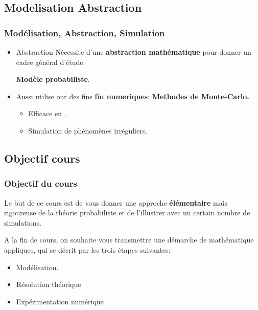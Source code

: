 \documentclass{beamer}
\begin{document}
\subsection{Modelisation Abstraction}
\begin{frame}[<+->]
    \frametitle{Modélisation, Abstraction, Simulation}
    
    \begin{itemize}
        \item {}

            \begin{block}{Abstraction}
                \small
                Nécessite d'une \alert{\textbf{abstraction mathématique}}  pour
                donner un cadre général d'étude.
            \end{block}
            \begin{center}
                \textbf{Modèle probabiliste}.
            \end{center}
        \item Aussi utilise our des fins \textbf{fin numeriques}:
            \alert{\textbf{Methodes de
        Monte-Carlo.}}
        \vspace{1cm}
         \begin{itemize}
             \item Efficace en \textbf{}.\\[.5cm]
             \item Simulation de \alert{{phénomènes irréguliers.}}
         \end{itemize}
    \end{itemize}
\end{frame}
\subsection{Objectif cours}
\begin{frame}[<+->]
    \frametitle{Objectif du cours}
    \small
    Le but  de ce cours est de vous donner une approche \textbf{élémentaire} mais
    \alert{rigoureuse} de la théorie probabiliste et de l'illustrer avec un
    certain nombre de simulations.
    \vspace{.5cm}
    
    A la fin de cours, on souhaite vous transmettre une démarche de mathématique
    appliques, qui se décrit par les trois étapes suivantes:

    \vspace{.5cm}
    \begin{itemize}
        \item Modélisation.
          \item Résolution théorique
          \item Expérimentation numérique
    \end{itemize}
\end{frame}
\end{document}
